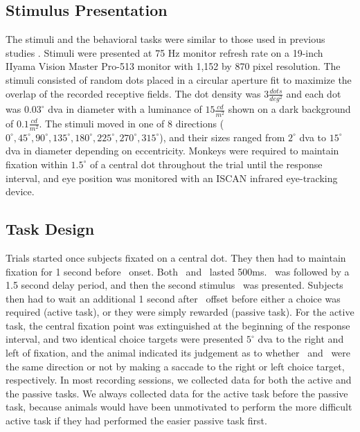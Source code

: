 \subsection*{Stimulus Presentation}
The stimuli and the behavioral tasks were similar to those used in previous studies \parencite{Hussar2012,Wimmer2016}.
Stimuli were presented at 75 Hz monitor refresh rate on a 19-inch IIyama Vision Master Pro-513 monitor with 1,152 by 870 pixel resolution. 
The stimuli consisted of random dots placed in a circular aperture fit to maximize the overlap of the recorded receptive fields. 
The dot density was $3\frac{dots}{deg^2}$ and each dot was $0.03^\circ$ \gls{dva} in diameter with a luminance of $15\frac{cd}{m^2}$ shown on a dark background of $0.1\frac{cd}{m^2}$.
The stimuli moved in one of 8 directions ($0^\circ, 45^\circ, 90^\circ, 135^\circ, 180^\circ, 225^\circ, 270^\circ, 315^\circ$), and their sizes ranged from $2^\circ$ \gls{dva} to $15^\circ$ \gls{dva} in diameter depending on eccentricity. 
Monkeys were required to maintain fixation within $1.5^{\circ}$ of a central dot throughout the trial until the response interval, and eye position was monitored with an ISCAN infrared eye-tracking device.

\subsection*{Task Design}
Trials started once subjects fixated on a central dot. They then had to maintain fixation for 1 second before \sample\ onset. Both \sample\ and \test\ lasted 500ms. \sample\ was followed by a 1.5 second delay period, and then the second stimulus \test\ was presented. Subjects then had to wait an additional 1 second after \test\ offset before either a choice was required (active task), or they were simply rewarded (passive task). For the active task, the central fixation point was extinguished at the beginning of the response interval, and two identical choice targets were presented $5^\circ$ \gls{dva} to the right and left of fixation, and the animal indicated its judgement as to whether \sample\ and \test\ were the same direction or not by making a saccade to the right or left choice target, respectively. In most recording sessions, we collected data for both the active and the passive tasks. We always collected data for the active task before the passive task, because animals would have been unmotivated to perform the more difficult active task if they had performed the easier passive task first.

